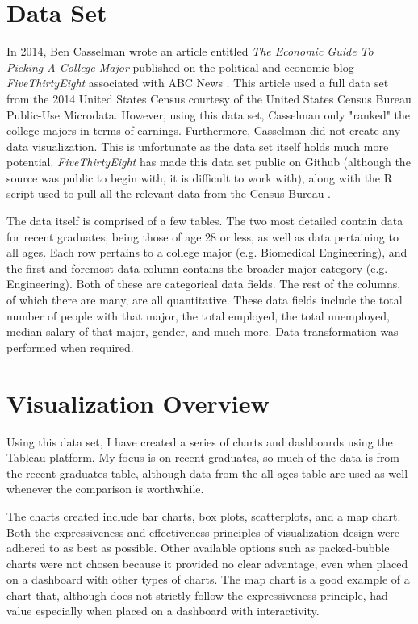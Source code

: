 \documentclass[sigchi]{acmart}
\begin{document}
\section{Data Set}

In 2014, Ben Casselman wrote an article entitled \textit{The Economic Guide To Picking A College Major} published on the political and economic blog \textit{FiveThirtyEight} associated with ABC News \cite{fivethirtyeight}. This article used a full data set from the 2014 United States Census courtesy of the United States Census Bureau Public-Use Microdata. However, using this data set, Casselman only "ranked" the college majors in terms of earnings. Furthermore, Casselman did not create any data visualization. This is unfortunate as the data set itself holds much more potential. \textit{FiveThirtyEight} has made this data set public on Github (although the source was public to begin with, it is difficult to work with), along with the R script used to pull all the relevant data from the Census Bureau \cite{github}. 

The data itself is comprised of a few tables. The two most detailed contain data for recent graduates, being those of age 28 or less, as well as data pertaining to all ages. Each row pertains to a college major (e.g. Biomedical Engineering), and the first and foremost data column contains the broader major category (e.g. Engineering). Both of these are categorical data fields. The rest of the columns, of which there are many, are all quantitative. These data fields include the total number of people with that major, the total employed, the total unemployed, median salary of that major, gender, and much more. Data transformation was performed when required.

\section{Visualization Overview}

Using this data set, I have created a series of charts and dashboards using the Tableau platform. My focus is on recent graduates, so much of the data is from the recent graduates table, although data from the all-ages table are used as well whenever the comparison is worthwhile. 

The charts created include bar charts, box plots, scatterplots, and a map chart. Both the expressiveness and effectiveness principles of visualization design \cite{munzner} were adhered to as best as possible. Other available options such as packed-bubble charts were not chosen because it provided no clear advantage, even when placed on a dashboard with other types of charts. The map chart is a good example of a chart that, although does not strictly follow the expressiveness principle, had value especially when placed on a dashboard with interactivity.
\end{document}
